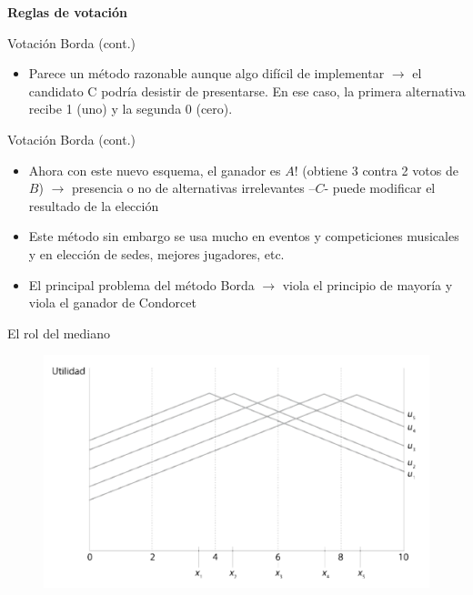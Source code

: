 \documentclass[
  ignorenonframetext,
]{beamer}
\providecommand{\tightlist}{%
  \setlength{\itemsep}{0pt}\setlength{\parskip}{0pt}}\usepackage{longtable,booktabs,array}
\begin{document}
\begin{frame}{\textbf{Reglas de votación}}
\begin{block}{Votación Borda (cont.)}
\begin{itemize}
  \begin{itemize}
  \tightlist
  \item
    \(A\) \(\longrightarrow\) 6 votos
  \item
    \(B\) \(\longrightarrow\) 7 votos
  \item
    \(C\) \(\longrightarrow\) 2 votos
  \end{itemize}
\item
  Parece un método razonable aunque algo difícil de implementar
  \(\longrightarrow\) el candidato C podría desistir de presentarse. En
  ese caso, la primera alternativa recibe 1 (uno) y la segunda 0 (cero).
\end{itemize}
\end{block}

\begin{block}{Votación Borda (cont.)}
\protect\hypertarget{votaciuxf3n-borda-cont.-2}{}
\begin{itemize}
\tightlist
\item
  Ahora con este nuevo esquema, el ganador es \(A\)! (obtiene 3 contra 2
  votos de \(B\)) \(\longrightarrow\) presencia o no de alternativas
  irrelevantes --\(C\)- puede modificar el resultado de la elección
\item
  Este método sin embargo se usa mucho en eventos y competiciones
  musicales y en elección de sedes, mejores jugadores, etc.
\item
  El principal problema del método Borda \(\longrightarrow\) viola el
  principio de mayoría y viola el ganador de Condorcet
\end{itemize}
\end{block}

\begin{block}{El rol del mediano}
\protect\hypertarget{el-rol-del-mediano}{}
\begin{figure}

{\centering \includegraphics{../epol/fig/fig-02-006.png}

}
\end{figure}
\end{block}
\end{frame}
\end{document}
